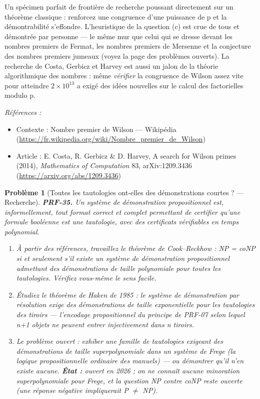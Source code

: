 \documentclass[11pt]{article}
\newtheorem{problem}{Problème}
\newenvironment{refs}{\par\small\noindent\emph{Références :}\begin{itemize}\setlength\itemsep{0pt}}{\end{itemize}\normalsize}
\begin{document}
\noindent Un spécimen parfait de frontière de recherche poussant directement sur un
théorème classique : renforcez une congruence d'une puissance de p et la démontrabilité
s'effondre. L'heuristique de la question (c) est crue de tous et démontrée par personne --- le
même mur que celui qui se dresse devant les nombres premiers de Fermat, les nombres premiers
de Mersenne et la conjecture des nombres premiers jumeaux (voyez la page des problèmes
ouverts). La recherche de Costa, Gerbicz et Harvey est aussi un jalon de la théorie
algorithmique des nombres : même \textit{vérifier} la congruence de Wilson assez vite pour
atteindre $ 2 \times 10^{13} $ a exigé des idées nouvelles sur le calcul des factorielles
modulo p.

\begin{refs}
\item Contexte : Nombre premier de Wilson --- Wikipédia (\url{https://fr.wikipedia.org/wiki/Nombre_premier_de_Wilson})
\item Article : E. Costa, R. Gerbicz \& D. Harvey, \og{} A search for Wilson primes \fg{} (2014), \textit{Mathematics of Computation} 83, arXiv:1209.3436 (\url{https://arxiv.org/abs/1209.3436})
\end{refs}

\bigskip

\begin{problem}[{Toutes les tautologies ont-elles des démonstrations courtes ? --- Recherche}]
\textbf{PRF-35.} Un système de démonstration propositionnel est, informellement, tout
format correct et complet permettant de certifier qu'une formule booléenne est une
tautologie, avec des certificats vérifiables en temps polynomial.
\begin{enumerate}
\item[(a)] À partir des références, travaillez le
théorème de Cook--Reckhow : NP = coNP si et seulement s'il existe un système de démonstration
propositionnel admettant des démonstrations de taille polynomiale pour toutes les
tautologies. Vérifiez vous-même le sens facile.
\item[(b)] Étudiez le théorème de Haken de 1985 : le système de démonstration par résolution exige
des démonstrations de taille exponentielle pour les tautologies des tiroirs --- l'encodage
propositionnel du principe de PRF-07 selon lequel n+1 objets ne peuvent entrer
injectivement dans n tiroirs.
\item[(c)] Le problème ouvert : exhiber une
famille de tautologies exigeant des démonstrations de taille superpolynomiale dans un
système de Frege (la logique propositionnelle ordinaire des manuels) --- ou démontrer qu'il
n'en existe aucune. \textbf{État :} ouvert en 2026 ; on ne connaît aucune minoration
superpolynomiale pour Frege, et la question NP contre coNP reste ouverte (une réponse
négative impliquerait P $\ne$ NP).
\end{enumerate}

\end{problem}
\end{document}
